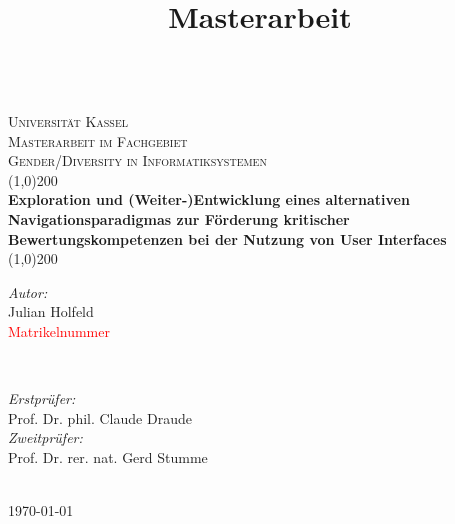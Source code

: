 \begin{titlepage}
    \centering
    \title{Masterarbeit}
    \vspace{2cm}
    \vspace{1cm}
    \textsc{\LARGE \\ Universität Kassel}\\[0.5cm] 
    \textsc{\large Masterarbeit im Fachgebiet}\\[0.5cm] 
    \textsc{\large Gender/Diversity in Informatiksystemen}\\[0.5cm] 

    \vspace{1.4cm}
    \line(1,0){200}
    \vspace{0.4cm}
    { \large \bfseries \\ Exploration und (Weiter-)Entwicklung eines alternativen Navigationsparadigmas zur Förderung kritischer Bewertungskompetenzen bei der Nutzung von User Interfaces}\\[0.2cm]
    \line(1,0){200}
    \vspace{1.5cm}\\

    \vspace{5cm}
    \begin{minipage}{0.4\textwidth}
        \begin{flushleft}
            \large\emph{Autor:}\\
            Julian Holfeld\\
            \textcolor{red}{Matrikelnummer}
        \end{flushleft}
    \end{minipage}~
    \begin{minipage}{0.4\textwidth}
        \begin{flushright}
            \large\emph{Erstprüfer:}\\
            Prof. Dr. phil. Claude Draude\\
            \large\emph{Zweitprüfer:}\\
            Prof. Dr. rer. nat. Gerd Stumme
        \end{flushright}
    \end{minipage}\\[2cm]
    {\large \today}\\[2cm]
    \vfill
\end{titlepage}
